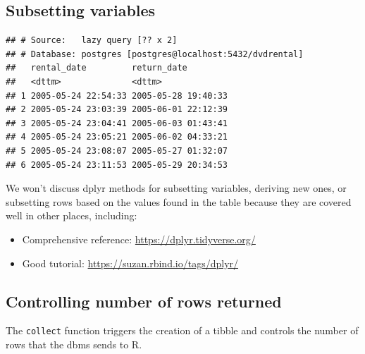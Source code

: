 \documentclass[]{book}
\newenvironment{Shaded}{\begin{snugshade}}{\end{snugshade}}
\newcommand{\DataTypeTok}[1]{\textcolor[rgb]{0.13,0.29,0.53}{#1}}
\newcommand{\DecValTok}[1]{\textcolor[rgb]{0.00,0.00,0.81}{#1}}
\newcommand{\KeywordTok}[1]{\textcolor[rgb]{0.13,0.29,0.53}{\textbf{#1}}}
\newcommand{\NormalTok}[1]{#1}
\newcommand{\OperatorTok}[1]{\textcolor[rgb]{0.81,0.36,0.00}{\textbf{#1}}}
\newcommand{\StringTok}[1]{\textcolor[rgb]{0.31,0.60,0.02}{#1}}
\providecommand{\tightlist}{%
  \setlength{\itemsep}{0pt}\setlength{\parskip}{0pt}}
\theoremstyle{definition}
\theoremstyle{definition}
\theoremstyle{definition}
\theoremstyle{remark}
\begin{document}
\hypertarget{subsetting-variables}{%
\subsection{Subsetting variables}\label{subsetting-variables}}

\begin{Shaded}
\end{Shaded}

\begin{verbatim}
## # Source:   lazy query [?? x 2]
## # Database: postgres [postgres@localhost:5432/dvdrental]
##   rental_date         return_date        
##   <dttm>              <dttm>             
## 1 2005-05-24 22:54:33 2005-05-28 19:40:33
## 2 2005-05-24 23:03:39 2005-06-01 22:12:39
## 3 2005-05-24 23:04:41 2005-06-03 01:43:41
## 4 2005-05-24 23:05:21 2005-06-02 04:33:21
## 5 2005-05-24 23:08:07 2005-05-27 01:32:07
## 6 2005-05-24 23:11:53 2005-05-29 20:34:53
\end{verbatim}

We won't discuss dplyr methods for subsetting variables, deriving new
ones, or subsetting rows based on the values found in the table because
they are covered well in other places, including:

\begin{itemize}
\tightlist
\item
  Comprehensive reference: \url{https://dplyr.tidyverse.org/}
\item
  Good tutorial: \url{https://suzan.rbind.io/tags/dplyr/}
\end{itemize}

\hypertarget{controlling-number-of-rows-returned}{%
\subsection{Controlling number of rows
returned}\label{controlling-number-of-rows-returned}}

The \texttt{collect} function triggers the creation of a tibble and
controls the number of rows that the dbms sends to R.

\begin{Shaded}
\end{Shaded}
\end{document}
